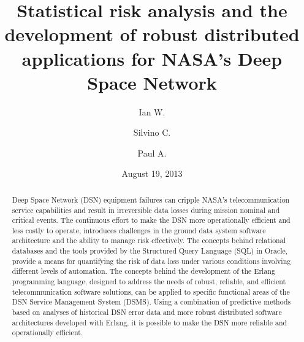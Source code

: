 \documentclass[aps,twocolumn,nobalancelastpage,amsmath,amssymb,
nofootinbib,superscriptaddress, ]{revtex4}
\begin{document}
\title{Statistical risk analysis and the development of robust distributed applications for NASA's Deep Space Network}
\author         {Ian W. }
\author         {Silvino C. }
\author         {Paul A. }
\date{August 19, 2013} %

\begin{abstract}
Deep Space Network (DSN) equipment failures can cripple NASA’s telecommunication service capabilities and result in irreversible data losses during mission nominal and critical events. The continuous effort to make the DSN more operationally efficient and less costly to operate, introduces challenges in the ground data system software architecture and the ability to manage risk effectively. The concepts behind relational databases and the tools provided by the Structured Query Language (SQL) in Oracle, provide a means for quantifying the risk of data loss under various conditions involving different levels of automation. The concepts behind the development of the Erlang programming language, designed to address the needs of robust, reliable, and efficient telecommunication software solutions, can be applied to specific functional areas of the DSN Service Management System (DSMS). Using a combination of predictive methods based on analyses of historical DSN error data and more robust distributed software architectures developed with Erlang, it is possible to make the DSN more reliable and operationally efficient.
\end{abstract}

\maketitle


\end{document}
